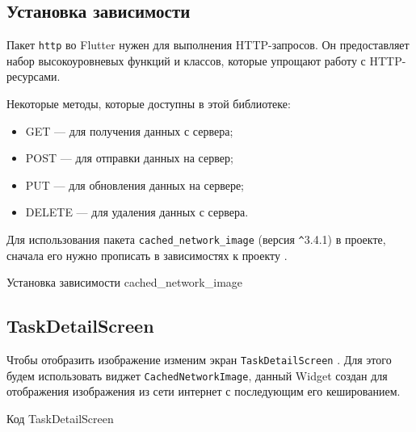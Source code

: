 

\subsection{Установка зависимости}

Пакет \texttt{http} во Flutter нужен для выполнения HTTP-запросов.
Он предоставляет набор высокоуровневых функций и классов,
которые упрощают работу с HTTP-ресурсами.

Некоторые методы, которые доступны в этой библиотеке:

\begin{itemize}
	\item GET --- для получения данных с сервера;
	\item POST --- для отправки данных на сервер;
	\item PUT --- для обновления данных на сервере;
	\item DELETE --- для удаления данных с сервера.
\end{itemize}

Для использования пакета \texttt{cached\_network\_image}
(версия \verb|^|3.4.1) в проекте, сначала его нужно прописать
в зависимостях к проекту .

\begin{image}
	\caption{Установка зависимости cached\_network\_image}
	\label{fig:cached:network:image}
\end{image}

\subsection{TaskDetailScreen}

Чтобы отобразить изображение изменим
экран \texttt{TaskDetailScreen} .
Для этого будем использовать виджет \texttt{CachedNetworkImage},
данный Widget создан для отображения изображения
из сети интернет с последующим его кешированием.

\begin{image}
	\caption{Код TaskDetailScreen}
	\label{fig:screen:detail}
\end{image}


